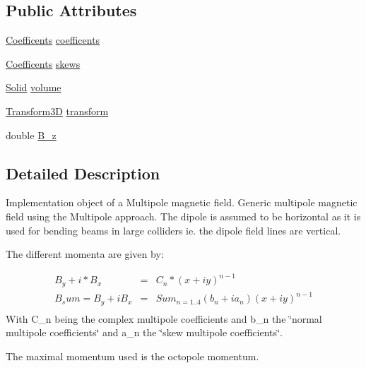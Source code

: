 \subsection*{Public Attributes}
\begin{DoxyCompactItemize}
\item 
\hyperlink{class_d_d4hep_1_1_geometry_1_1_multipole_field_a760b1b7561c93dd8438ea523cbc660bc}{Coefficents} \hyperlink{class_d_d4hep_1_1_geometry_1_1_multipole_field_a0d73fa0209b6773df83c05b53060324a}{coefficents}
\item 
\hyperlink{class_d_d4hep_1_1_geometry_1_1_multipole_field_a760b1b7561c93dd8438ea523cbc660bc}{Coefficents} \hyperlink{class_d_d4hep_1_1_geometry_1_1_multipole_field_a52a44a6298e89815f17e1c271b7644d2}{skews}
\item 
\hyperlink{class_d_d4hep_1_1_geometry_1_1_solid__type}{Solid} \hyperlink{class_d_d4hep_1_1_geometry_1_1_multipole_field_a6ff1c10d2c4b9a47db39b466e45de63a}{volume}
\item 
\hyperlink{namespace_d_d4hep_1_1_geometry_aeb4c0356d12fd7be49a0aae50514e64b}{Transform3D} \hyperlink{class_d_d4hep_1_1_geometry_1_1_multipole_field_aa4040740a5339e8dc1f1d7e65187ea0e}{transform}
\item 
double \hyperlink{class_d_d4hep_1_1_geometry_1_1_multipole_field_a5b182acb00dda0675a4166293230e948}{B\_\-z}
\end{DoxyCompactItemize}


\subsection{Detailed Description}
Implementation object of a Multipole magnetic field. Generic multipole magnetic field using the Multipole approach. The dipole is assumed to be horizontal as it is used for bending beams in large colliders ie. the dipole field lines are vertical.

The different momenta are given by:

\begin{eqnarray*} B_y + i*B_x &=& C_n * (x + iy)^{n-1} \\ B_sum = B_y + i B_x &=& Sum_{n=1..4} (b_n + ia_n) (x + iy)^{n-1} \\ \end{eqnarray*} With C\_\-n being the complex multipole coefficients and b\_\-n the \char`\"{}normal multipole coefficients\char`\"{} and a\_\-n the \char`\"{}skew multipole coefficients\char`\"{}.

The maximal momentum used is the octopole momentum.

